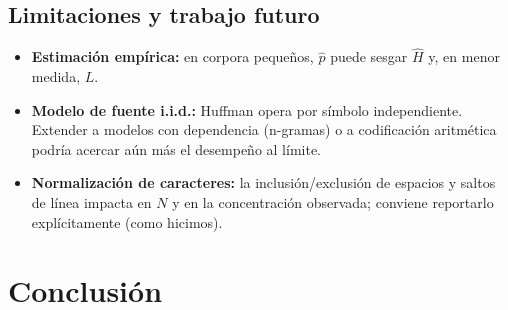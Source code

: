 \documentclass[12pt, a4paper]{article}
\begin{document}
\subsection*{Limitaciones y trabajo futuro}
\begin{itemize}
  \item \textbf{Estimación empírica:} en corpora pequeños, $\hat p$ puede sesgar $\hat H$ y, en menor medida, $L$. 
  \item \textbf{Modelo de fuente i.i.d.:} Huffman opera por símbolo independiente. Extender a modelos con dependencia (n-gramas) o a codificación aritmética podría acercar aún más el desempeño al límite.
  \item \textbf{Normalización de caracteres:} la inclusión/exclusión de espacios y saltos de línea impacta en $N$ y en la concentración observada; conviene reportarlo explícitamente (como hicimos).
\end{itemize}

\section*{Conclusión}
\end{document}
